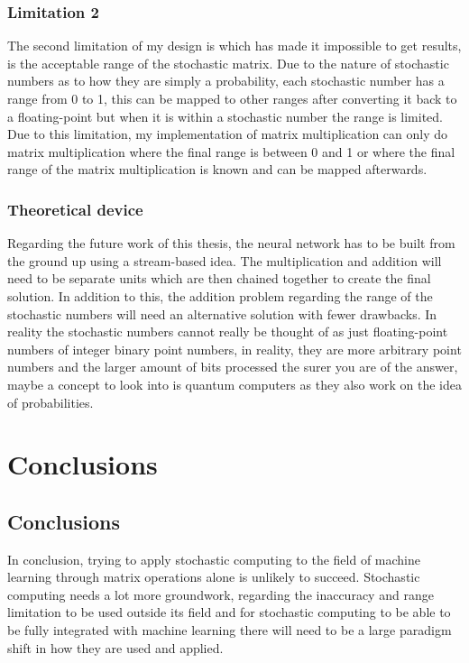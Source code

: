 \documentclass[a4paper,oneside,phd,etd]{BYUPhys}
\begin{document}
\subsection{Limitation 2}
The second limitation of my design is which has made it impossible to get results, is the acceptable range of the stochastic matrix. Due to the nature of stochastic numbers as to how they are simply a probability, each stochastic number has a range from 0 to 1, this can be mapped to other ranges after converting it back to a floating-point but when it is within a stochastic number the range is limited. Due to this limitation, my implementation of matrix multiplication can only do matrix multiplication where the final range is between 0 and 1 or where the final range of the matrix multiplication is known and can be mapped afterwards.

\subsection{Theoretical device}
Regarding the future work of this thesis, the neural network has to be built from the ground up using a stream-based idea. The multiplication and addition will need to be separate units which are then chained together to create the final solution. In addition to this, the addition problem regarding the range of the stochastic numbers will need an alternative solution with fewer drawbacks. In reality the stochastic numbers cannot really be thought of as just floating-point numbers of integer binary point numbers, in reality, they are more arbitrary point numbers and the larger amount of bits processed the surer you are of the answer, maybe a concept to look into is quantum computers as they also work on the idea of probabilities.

\chapter{Conclusions}
\label{chap:Conclusions}

\section{Conclusions}
\label{sec:ConclusionsConclusions}
In conclusion, trying to apply stochastic computing to the field of machine learning through matrix operations alone is unlikely to succeed. Stochastic computing needs a lot more groundwork, regarding the inaccuracy and range limitation to be used outside its field and for stochastic computing to be able to be fully integrated with machine learning there will need to be a large paradigm shift in how they are used and applied.
\end{document}
